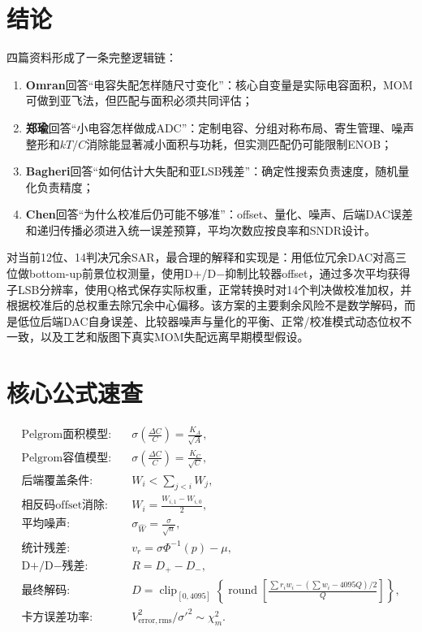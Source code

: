 \documentclass[UTF8,a4paper,11pt]{ctexart}
\newcommand{\sigc}{\sigma\!\left(\frac{\Delta C}{C}\right)}
\newcommand{\clip}{\operatorname{clip}}
\newcommand{\round}{\operatorname{round}}
\begin{document}
\section{结论}

四篇资料形成了一条完整逻辑链：
\begin{enumerate}
  \item \textbf{Omran}回答“电容失配怎样随尺寸变化”：核心自变量是实际电容面积，MOM可做到亚飞法，但匹配与面积必须共同评估；
  \item \textbf{郑瑜}回答“小电容怎样做成ADC”：定制电容、分组对称布局、寄生管理、噪声整形和$kT/C$消除能显著减小面积与功耗，但实测匹配仍可能限制ENOB；
  \item \textbf{Bagheri}回答“如何估计大失配和亚LSB残差”：确定性搜索负责速度，随机量化负责精度；
  \item \textbf{Chen}回答“为什么校准后仍可能不够准”：offset、量化、噪声、后端DAC误差和递归传播必须进入统一误差预算，平均次数应按良率和SNDR设计。
\end{enumerate}

对当前12位、14判决冗余SAR，最合理的解释和实现是：用低位冗余DAC对高三位做bottom-up前景位权测量，使用D+/D$-$抑制比较器offset，通过多次平均获得子LSB分辨率，使用Q格式保存实际权重，正常转换时对14个判决做校准加权，并根据校准后的总权重去除冗余中心偏移。该方案的主要剩余风险不是数学解码，而是低位后端DAC自身误差、比较器噪声与量化的平衡、正常/校准模式动态位权不一致，以及工艺和版图下真实MOM失配远离早期模型假设。

\appendix
\section{核心公式速查}

\begin{align}
\text{Pelgrom面积模型:}\quad &\sigc=\frac{K_A}{\sqrt A},\\
\text{Pelgrom容值模型:}\quad &\sigc=\frac{K_C}{\sqrt C},\\
\text{后端覆盖条件:}\quad &W_i<\sum_{j<i}W_j,\\
\text{相反码offset消除:}\quad &W_i=\frac{W_{i,1}-W_{i,0}}{2},\\
\text{平均噪声:}\quad &\sigma_{\widehat W}=\frac{\sigma}{\sqrt n},\\
\text{统计残差:}\quad &v_r=\sigma\Phi^{-1}(p)-\mu,\\
\text{D+/D$-$残差:}\quad &R=D_+-D_-,\\
\text{最终解码:}\quad &D=\clip_{[0,4095]}\left\{\round\left[\frac{\sum r_iw_i-(\sum w_i-4095Q)/2}{Q}\right]\right\},\\
\text{卡方误差功率:}\quad &V_{\mathrm{error,rms}}^2/\sigma'^2\sim\chi_m^2.
\end{align}
\end{document}
